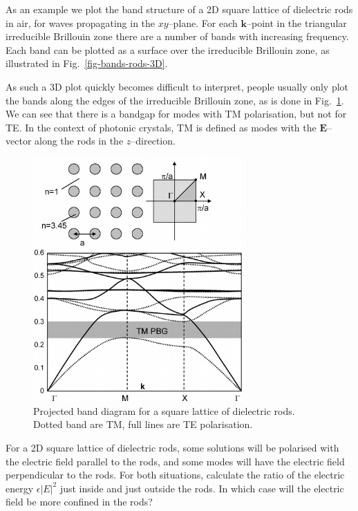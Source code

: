 As an example we plot the band structure of a 2D square lattice of dielectric rods in air, for waves propagating in the $xy$--plane. For each ${\mathbf k}$--point in the triangular irreducible Brillouin zone there are a number of bands with increasing frequency. Each band can be plotted as a surface over the irreducible Brillouin zone, as illustrated in Fig.~\ref{fig-bands-rods-3D}.

As such a 3D plot quickly becomes difficult to interpret, people usually only plot the bands along the edges of the irreducible Brillouin zone, as is done in Fig.~\ref{fig-bands-rods}. We can see that there is a bandgap for modes with TM polarisation, but not for TE. In the context of photonic crystals, TM is defined as modes with the ${\mathbf E}$--vector along the rods in the $z$--direction.

\begin{figure}
\centering
\includegraphics[width=8cm]{symmetry/figures/square_bands}
\caption{Projected band diagram for a square lattice of dielectric rods. Dotted band are TM, full lines are TE polarisation.}
\label{fig-bands-rods}
\end{figure}


\begin{exer}
For a 2D square lattice of dielectric rods, some solutions will be polarised with the electric field parallel to the rods, and some modes will have the electric field perpendicular to the rods. For both situations, calculate the ratio of the electric energy $\epsilon |E|^2$ just inside and just outside the rods. In which case will the electric field be more confined in the rods?
\end{exer}

